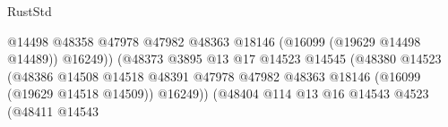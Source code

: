 \begin{lexlean}{RustStd}
\begin{coremodule}
                                                                    @14498
                                                                    @48358
                                                                    @47978
                                                                    @47982
                                                                    @48363
                                                                    @18146
                                                                    (@16099 (@19629 @14498 @14489))
                                                                    @16249))
                                                                (@48373
                                                                  @3895
                                                                  @13
                                                                  @17
                                                                  @14523
                                                                  @14545
                                                                  (@48380
                                                                    @14523
                                                                    (@48386
                                                                      @14508
                                                                      @14518
                                                                      @48391
                                                                      @47978
                                                                      @47982
                                                                      @48363
                                                                      @18146
                                                                      (@16099
                                                                        (@19629 @14518 @14509))
                                                                      @16249))
                                                                  (@48404
                                                                    @114
                                                                    @13
                                                                    @16
                                                                    @14543
                                                                    @4523
                                                                    (@48411
                                                                      @14543

\end{coremodule}
\end{lexlean}

